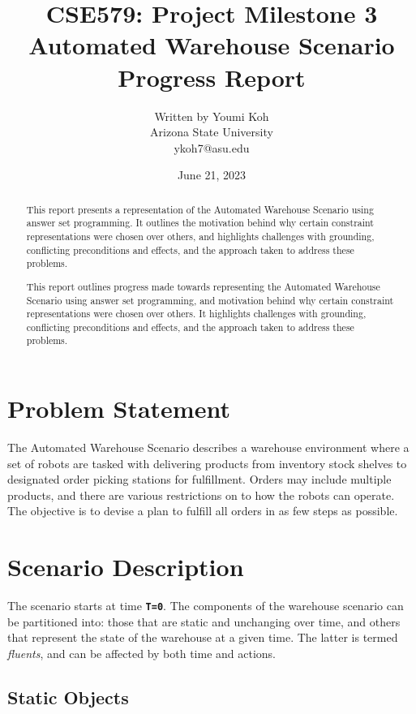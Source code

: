 \documentclass[letterpaper]{article}
\title{
    CSE579: Project Milestone 3\\
    Automated Warehouse Scenario\\
    Progress Report}
\author{
    Written by Youmi Koh \\
    Arizona State University \\
    ykoh7@asu.edu
}
\date{June 21, 2023}
\newcommand{\ct}[1]{\texttt{\textbf{#1}}}
\begin{document}
\maketitle


\begin{abstract}
This report presents a representation of the Automated Warehouse Scenario using answer set programming. It outlines the motivation behind why certain constraint representations were chosen over others, and highlights challenges with grounding, conflicting preconditions and effects, and the approach taken to address these problems.



This report outlines progress made towards representing the Automated Warehouse Scenario using answer set programming, and motivation behind why certain constraint representations were chosen over others. It highlights challenges with grounding, conflicting preconditions and effects, and the approach taken to address these problems.
\end{abstract}

\section{Problem Statement}

\noindent The Automated Warehouse Scenario describes a warehouse environment where a set of robots are tasked with delivering products from inventory stock shelves to designated order picking stations for fulfillment. Orders may include multiple products, and there are various restrictions on to how the robots can operate. The objective is to devise a plan to fulfill all orders in as few steps as possible.

\section{Scenario Description}

The scenario starts at time \ct{T=0}. The components of the warehouse scenario can be partitioned into: those that are static and unchanging over time, and others that represent the state of the warehouse at a given time. The latter is termed \emph{fluents}, and can be affected by both time and actions.

\subsection{Static Objects}
\end{document}
